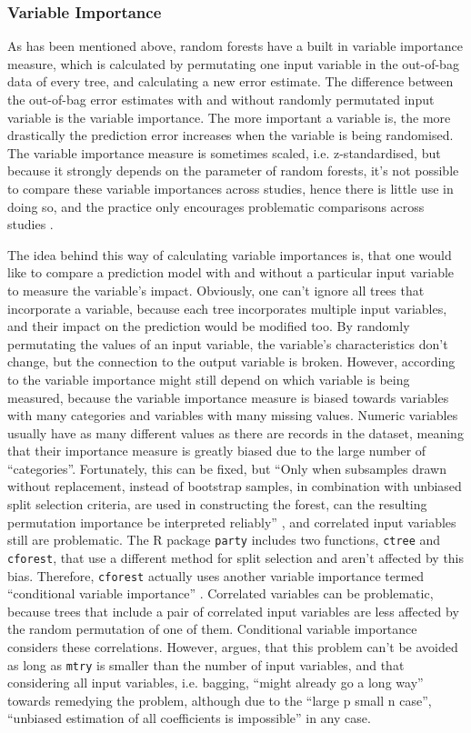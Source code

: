 \documentclass[a4paper,man,12pt,apacite,floatsintext,draftfirst]{apa6} %
\begin{document}
\subsubsection{Variable Importance}
As has been mentioned above, random forests have a built in variable
importance measure, which is calculated by permutating one input variable
in the out-of-bag data of every tree, and calculating a new error estimate.
The difference between the out-of-bag error estimates with and without
randomly permutated input variable is the variable importance.
The more important a variable is, the more drastically the prediction error
increases when the variable is being randomised.
The variable importance measure is sometimes scaled, i.e. z-standardised,
but because it strongly depends on the parameter of random forests,
it's not possible to compare these variable importances across studies,
hence there is little use in doing so, and the practice only encourages
problematic comparisons across studies \cite{strobl2009introduction}.

The idea behind this way of calculating variable importances is,
that one would like to compare a prediction model with and without a
particular input variable to measure the variable's impact.
Obviously, one can't ignore all trees that incorporate a variable,
because each tree incorporates multiple input variables, and their impact
on the prediction would be modified too.
By randomly permutating the values of an input variable,
the variable's characteristics don't change, but the connection to the
output variable is broken.
However, according to  the variable importance might
still depend on which variable is being measured, because the
variable importance measure is biased towards variables with many categories
and variables with many missing values.
Numeric variables usually have as many different values as there are records
in the dataset, meaning that their importance measure is greatly biased due
to the large number of “categories”.
Fortunately, this can be fixed, but “Only when subsamples drawn without
replacement, instead of bootstrap samples, in combination with unbiased
split selection criteria, are used in constructing the forest, can the
resulting permutation importance be interpreted reliably”
\cite{strobl2007bias}, and correlated input variables still are
problematic.
The R package \texttt{party} includes two functions, \texttt{ctree} and
\texttt{cforest}, that use a different method for split selection and aren't
affected by this bias.
Therefore, \texttt{cforest} actually uses another variable importance termed
“conditional variable importance” \cite{strobl2008conditional}.
Correlated variables can be problematic, because trees that include a
pair of correlated input variables are less affected by the random
permutation of one of them.
Conditional variable importance considers these correlations.
However,  argues, that this problem can't be avoided
as long as \texttt{mtry} is smaller than the number of input variables,
and that considering all input variables, i.e. bagging,
“might already go a long way” towards remedying the problem,
although due to the “large p small n case”, “unbiased estimation of all
coefficients is impossible” in any case.
\end{document}
